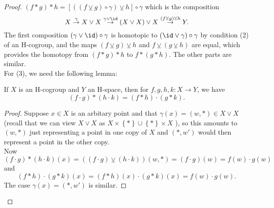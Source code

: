 \begin{proof}
     $\left( f*g \right) *h
     = \left[ \left( \left( f \veebar g \right) \circ \gamma
     \right) \veebar h \right] \circ \gamma$ which is the
     composition
     \[
     X \stackrel{\gamma}{\to} X \vee X
     \stackrel{\gamma \vee \id}{\to} 
     \left( X \vee X \right) \vee X
     \stackrel{\left( f \veebar g \right) \veebar h}{\to} 
     Y.
     \] 
     The first composition 
     $\left( \gamma \vee \id \right) \circ \gamma$ is
     homotopic to $\left( \id \vee \gamma \right) \circ \gamma$ 
     by condition (2) of an H-cogroup, and
     the maps $\left( f \veebar g \right) \veebar h$ 
     and $f \veebar \left( g \veebar h \right) $ are
     equal, which provides the homotopy
     from $\left( f*g \right) *h $ to
     $f* \left( g*h \right) $. The other
     parts are similar.\\
     \linebreak
     For (3), we need the following lemma:
     \begin{lemma}[]
         If $X$ is an H-cogroup and $Y$ an
         H-space, then for
         $f,g,h,k \colon X \to Y$, we have
         \[
             \left( f\cdot g \right) * \left( h\cdot k \right) 
             = \left( f*h \right) \cdot \left( g*k \right) .
         \] 
     \end{lemma}

     \begin{proof}
         Suppose $x \in X$ is an arbitary point
         and that $\gamma(x) = 
         \left( w,* \right) \in X \vee X$ (recall
         that we can view $X \vee X$ as
         $X \times \left\{ * \right\} \cup 
         \left\{ * \right\} \times X$ ), so
         this amounts to $\left( w,* \right) $ just
         representing a point in one copy of
         $X$ and $\left( *,w' \right) $ would then
         represent a point in the other copy.\\
         Now
         \[
             \left( f\cdot g \right) *
             \left( h\cdot k \right) (x)
             = \left( \left( f \cdot g \right) 
             \veebar \left( h\cdot k \right) \right) 
             \left( w,* \right) 
             = \left( f\cdot g \right) (w) 
             = f(w) \cdot g(w)
         \] 
         and
         \[
             \left( f*h \right) \cdot 
             \left( g*k \right) (x)
             = (f*h)(x) \cdot (g*k)(x)
             = f(w) \cdot g(w).
         \] 
         The case $\gamma(x) = (*,w')$ is similar.
     \end{proof}


\end{proof}
